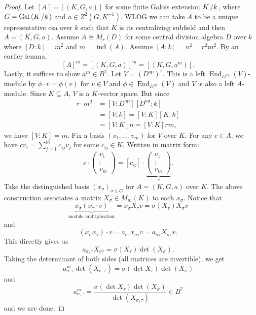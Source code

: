 \documentclass[10pt, a4paper]{article}
\newenvironment{noticeC}{%
  \tcolorbox[%
  notitle,
  empty,
  enhanced,  %
  breakable,
  coltext=black, 
  fontupper=\rmfamily,
  noparskip,
  sharp corners,
  boxrule=-1pt,  %
  frame hidden,
  left=7pt,  %
  right=7pt,
  top=5pt,
  bottom=5pt,
  before skip=2.5ex plus 2pt,
  after skip=2.5ex plus 2pt,
  overlay unbroken and last={%
  },
  ]}
{\endtcolorbox}
\newenvironment{myproof}%
  {\begin{noticeC}\begin{proof}}%
  {\end{proof}\end{noticeC}}
\newcommand{\quot}[2]{{\raisebox{0em}{$#1$}\left/\raisebox{0em}{$#2$}\right.}}
\newcommand{\gal}[1]{\mathrm{Gal}\, {\left(#1\right)}}
\DeclareMathOperator{\op}{op}
\DeclareMathOperator{\en}{End}
\DeclareMathOperator{\ind}{ind}
\begin{document}
\begin{myproof}
  Let $[A] = [(K, G, a)]$ for some finite Galois extension $\quot{K}{k}$,
  where $G = \gal{\quot{K}{k}}$ and $a \in Z^2 (G, K^{-1})$.
  WLOG we can take $A$ to be a unique representative csa over $k$ such that $K$ is its centralizing subfield
  and then $A = (K, G, a)$.
  Assume $A \cong M_r (D)$ for some central division algebra $D$ over $k$
  where $[D : k] = m^2$ and $m = \ind (A)$.
  Assume $[A : k] = n^2 = r^2 m^2$. By an earlier lemma,
  $$[A]^m = [(K, G, a)]^m = [(K, G, a^m)].$$
  Lastly, it suffices to show $a^m \in B^2$.
  Let $V = (D^{\op})^r$. This is a left $\en_{D^{\op}} (V)$-module 
  by $\phi \cdot v = \phi (v)$ for $v \in V$ and $\phi \in \en_{D^{\op}} (V)$
  and $V$ is also a left $A$-module. Since $K \subseteq A$, $V$ is a $K$-vector space.
  But since 
  \begin{align*}
    r \cdot m^2 &= [V : D^{\op}] [D^{\op} : k]\\
    &= [V : k] = [V: K] [K : k]\\
    &= [V : K]n = [V : K] rm,
  \end{align*}
  we have $[V : K] = m$. Fix a basis $(v_1, \dots, v_m)$ for $V$ over $K$.
  For any $c \in A$, we have $c v_i = \sum_{j = 1} ^m c_{ij} v_j$ for some $c_{ij} \in K$.
  Written in matrix form:
  $$c \cdot \begin{pmatrix}
    v_1\\ \vdots\\ v_m
  \end{pmatrix} = [c_{ij}] \cdot \underbrace{\begin{pmatrix}
    v_1\\ \vdots\\ v_m
  \end{pmatrix}}_{v}.$$
  Take the distinguished basis $(x_\sigma)_{\sigma \in G}$ for $A = (K, G, a)$ over $K$.
  The above construction associates a matrix $X_{\sigma} \in M_m (K)$ to each $x_{\sigma}$.
  Notice that 
  $$\underbrace{x_{\sigma} (x_{\tau} \cdot v)}_{\textrm{module multiplication}} = x_{\sigma} X_{\tau} v = \sigma (X_{\tau}) X_{\sigma} v$$
  and
  $$(x_{\sigma} x_{\tau}) \cdot v = a_{\sigma \tau} x_{\sigma \tau} v = a_{\sigma \tau} X_{\sigma \tau} v.$$
  This directly gives us 
  $$a_{\sigma, \tau} X_{\sigma\tau} = \sigma (X_{\tau}) \det (X_{\sigma}).$$
  Taking the determinant of both sides (all matrices are invertible), we get 
  $$a_{\sigma, \tau} ^m \det (X_{\sigma, \tau}) = \sigma (\det X_{\tau}) \det (X_{\sigma})$$
  and 
  $$a_{\sigma, \tau} ^m  = \frac{\sigma (\det X_{\tau}) \det (X_{\sigma})}{\det (X_{\sigma, \tau})} \in B^2$$
  and we are done.
\end{myproof}
\end{document}

